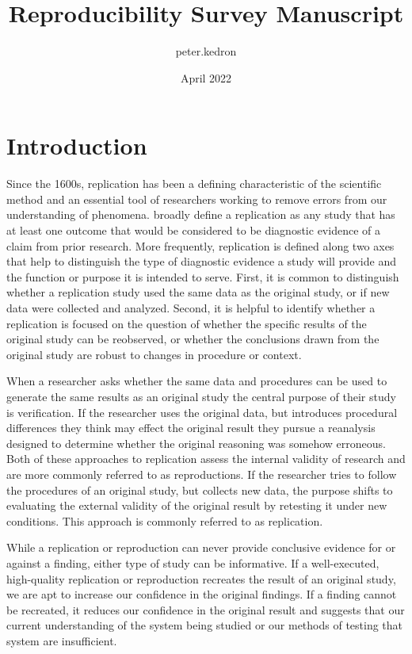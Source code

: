 \documentclass{article}
\title{Reproducibility Survey Manuscript}
\author{peter.kedron }
\date{April 2022}
\begin{document}
\maketitle

\section{Introduction}
Since the 1600s, replication has been a defining characteristic of the scientific method and an essential tool of researchers working to remove errors from our understanding of phenomena. 
\citet{nosek2020} broadly define a replication as any study that has at least one outcome that would be considered to be diagnostic evidence of a claim from prior research.
More frequently, replication is defined along two axes that help to distinguish the type of diagnostic evidence a study will provide and the function or purpose it is intended to serve. 
First, it is common to distinguish whether a replication study used the same data as the original study, or if new data were collected and analyzed. 
Second, it is helpful to identify whether a replication is focused on the question of whether the specific results of the original study can be reobserved, or whether the conclusions drawn from the original study are robust to changes in procedure or context.

When a researcher asks whether the same data and procedures can be used to generate the same results as an original study the central purpose of their study is verification.
If the researcher uses the original data, but introduces procedural differences they think may effect the original result they pursue a reanalysis designed to determine whether the original reasoning was somehow erroneous. 
Both of these approaches to replication assess the internal validity of research and are more commonly referred to as reproductions.
If the researcher tries to follow the procedures of an original study, but collects new data, the purpose shifts to evaluating the external validity of the original result by retesting it under new conditions.
This approach is commonly referred to as replication. 

While a replication or reproduction can never provide conclusive evidence for or against a finding, either type of study can be informative. 
If a well-executed, high-quality replication or reproduction recreates the result of an original study, we are apt to increase our confidence in the original findings. 
If a finding cannot be recreated, it reduces our confidence in the original result and suggests that our current understanding of the system being studied or our methods of testing that system are insufficient.
\end{document}
